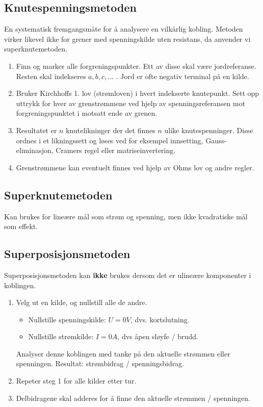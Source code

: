 \documentclass{article}
\begin{document}
\subsection{Knutespenningsmetoden}
En systematisk fremgangsmåte for å analysere en vilkårlig kobling. Metoden virker likevel ikke for grener med spenningskilde uten resistans, da anvender vi superknutemetoden.
\begin{enumerate}
    \item Finn og marker alle forgreningspunkter. Ett av disse skal være jordreferanse. Resten skal indekseres $a, b, c, ...$ . Jord er ofte negativ terminal på en kilde.
    \item Bruker Kirchhoffs 1. lov (strømloven) i hvert indekserte knutepunkt. Sett opp uttrykk for hver av grenstrømmene ved hjelp av spenningsreferansen mot forgreningspunktet i motsatt ende av grenen.
    \item Resultatet er $n$ knutelikninger der det finnes $n$ ulike knutespenninger. Disse ordnes i et likningssett og løses ved for eksempel innsetting, Gauss-eliminasjon, Cramers regel eller matriseinvertering.
    \item Grenstrømmene kan eventuelt finnes ved hjelp av Ohms lov og andre regler.
\end{enumerate}

\subsection{Superknutemetoden}
Kan brukes for lineære mål som strøm og spenning, men ikke kvadratiske mål som effekt.

\subsection{Superposisjonsmetoden}
Superposisjonsmetoden kan \textbf{ikke} brukes dersom det er ulineære komponenter i koblingen.
\begin{enumerate}
    \item Velg ut en kilde, og nullstill alle de andre. \begin{itemize}
        \item Nullstille spenningskilde: $U = 0V$, dvs. kortslutning.
        \item Nullstille strømkilde: $I = 0A$, dvs åpen sløyfe / brudd.
    \end{itemize}
    Analyser denne koblingen med tanke på den aktuelle strømmen eller spenningen. Resultat: strømbidrag / spenningsbidrag.
    \item Repeter steg 1 for alle kilder etter tur.
    \item Delbidragene skal adderes for å finne den aktuelle strømmen / spenningen.
\end{enumerate}
\end{document}
